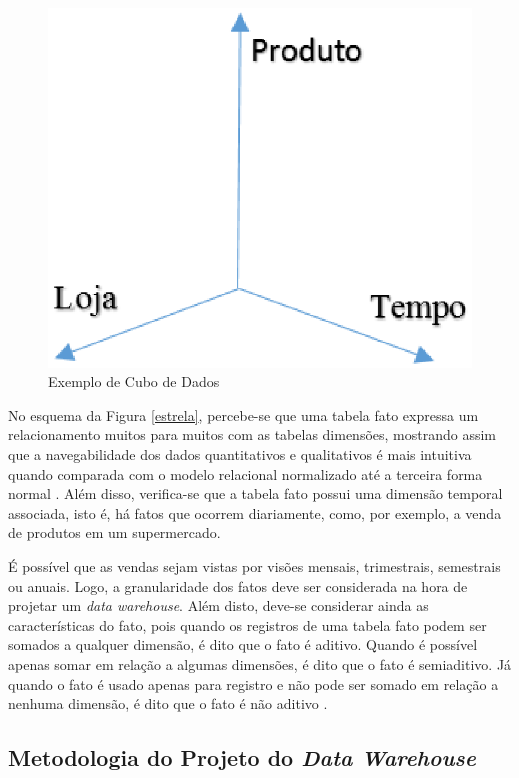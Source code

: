 {\begin{figure}[h!]
\centering
\includegraphics[keepaspectratio=false,scale=0.85]{figuras/cube.eps}
\caption{Exemplo de Cubo de Dados}
\label{cube}
\end{figure}
\FloatBarrier


No esquema da Figura \ref{estrela}, percebe-se que uma tabela fato expressa um relacionamento muitos para muitos com as tabelas dimensões, mostrando assim que a navegabilidade dos dados quantitativos e qualitativos é mais intuitiva quando comparada com o modelo relacional normalizado até a terceira forma normal \cite{Kimball2002}. Além disso, verifica-se que a tabela fato possui uma dimensão temporal associada, isto é, há fatos que ocorrem diariamente, como, por exemplo, a venda de produtos em um supermercado. 

É possível que as vendas sejam vistas por visões mensais, trimestrais, semestrais ou anuais. Logo, a granularidade dos fatos deve ser considerada na hora de projetar um \textit{data warehouse}. Além disto, deve-se considerar ainda as características do fato, pois quando os registros de uma tabela fato podem ser somados a qualquer dimensão, é dito que o fato é aditivo. Quando é possível apenas somar em relação a algumas dimensões, é dito que o fato é semiaditivo. Já quando o fato é usado apenas para registro e não pode ser somado em relação a nenhuma dimensão, é dito que o fato é não aditivo \cite{Inmon1992}.

\subsection{Metodologia do Projeto do \textit{Data Warehouse}}
\label{sec:metodologia-dw}

}
